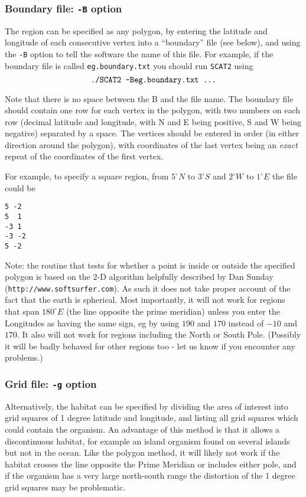 \documentclass[10pt,titlepage,times,letterpaper]{article}
\def\SCAT{{\tt SCAT2} }
\begin{document}
\subsubsection{Boundary file:  {\tt -B} option}
The region can be specified as any polygon, by entering the latitude and longitude of
each consecutive vertex into a ``boundary'' file (see below), and using
the {\tt -B} option to tell the software the name of this file.
For example, if the boundary file is called {\tt eg.boundary.txt} you
should run \SCAT using
$$\text{\tt ./SCAT2 -Beg.boundary.txt ...}$$ 

Note that there is no space between the B and the file name.
The boundary file should contain one row for each vertex in the
polygon, with two numbers on each row (decimal latitude and longitude,
with N and E being positive, S and W being negative) separated by a
space. The vertices should be entered in order (in either direction
around the polygon), with coordinates of the last vertex being an {\it
exact} repeat of the coordinates of the first vertex.

For example, to specify a square region, from $5^\circ N$ to $3^\circ S$ and
$2^\circ W$ to $1^\circ E$ the file could be
\begin{verbatim}
5 -2
5  1
-3 1
-3 -2
5 -2
\end{verbatim}

Note: the routine that tests for whether a point is inside or outside
the specified polygon is based on the 2-D algorithm helpfully
described by Dan Sunday ({\tt http://www.softsurfer.com}). As such it
does not take proper account of the fact that the earth is
spherical. Most importantly, it will not work for regions that span
$180^\circ E$ (the line opposite the prime meridian) unless you enter
the Longitudes as having the same sign, eg by using $190$ and $170$
instead of $-10$ and $170$. It also will not work for regions
including the North or South Pole.  (Possibly it will be badly behaved
for other regions too - let
us know if you encounter any problems.)

\subsubsection{Grid file:  {\tt -g} option}

Alternatively, the habitat can be specified by dividing the area of interest into grid
squares of 1 degree latitude and longitude, and listing all grid squares which could
contain the organism.  An advantage of this method is that it allows a discontinuous
habitat, for example an island organism found on several islands but not in the ocean.
Like the polygon method, it will likely not work if the habitat crosses the line
opposite the Prime Meridian or includes either pole, and if the organism has a very large 
north-south range the distortion of the 1 degree grid squares may be problematic.
\end{document}

